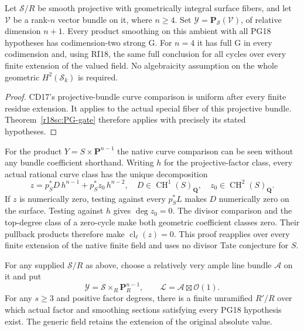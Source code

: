 \begin{corollary}
\label{r18sc:surface-bundle}
Let $\mathcal S/R$ be smooth projective with
geometrically integral surface fibers, and
let $\mathcal V$ be a rank-$n$ vector bundle
on it, where $n\ge4$.  Set
$\mathcal Y=\mathbf P_{\mathcal S}(\mathcal V)$,
of relative dimension $n+1$.
Every product smoothing on this ambient
with all PG18 hypotheses has codimension-two
strong G.  For $n=4$ it has full G in
every codimension and, using RI18, the
same full conclusion for all cycles over
every finite extension of the valued field.
No algebraicity assumption on the whole
geometric $H^2(\mathcal S_k)$ is required.
\end{corollary}

\begin{proof}
CD17's projective-bundle curve comparison
is uniform after every finite residue
extension.  It applies to the actual
special fiber of this projective bundle.
Theorem~\ref{r18sc:PG-gate} therefore
applies with precisely its stated hypotheses.
\end{proof}

For the product $Y=S\times\mathbf P^{n-1}$
the native curve comparison can be seen
without any bundle coefficient shorthand.
Writing $h$ for the projective-factor class,
every actual rational curve class has the
unique decomposition
\[
 z=p_S^*D\,h^{n-1}+p_S^*z_0\,h^{n-2},
 \quad D\in\operatorname{CH}^1(S)_{\mathbf Q},
 \quad z_0\in\operatorname{CH}^2(S)_{\mathbf Q}.
 \tag{SC18.6}\label{r18sc:product-curves}
\]
If $z$ is numerically zero, testing against
every $p_S^*L$ makes $D$ numerically zero
on the surface.  Testing against $h$ gives
$\deg z_0=0$.  The divisor comparison and
the top-degree class of a zero-cycle make
both geometric coefficient classes zero.
Their pullback products therefore make
$\operatorname{cl}_\ell(z)=0$.
This proof reapplies over every finite
extension of the native finite field and
uses no divisor Tate conjecture for $S$.

\begin{lemma}
\label{r18sc:local-existence}
For any supplied $\mathcal S/R$ as above,
choose a relatively very ample line bundle
$\mathcal A$ on it and put
\[
 \mathcal Y=\mathcal S\times_R\mathbf P_R^{n-1},
       \qquad\mathcal L=\mathcal A\boxtimes\mathcal O(1).
 \tag{SC18.7}\label{r18sc:product-polarization}
\]
For any $s\ge3$ and positive factor degrees,
there is a finite unramified $R'/R$ over
which actual factor and smoothing sections
satisfying every PG18 hypothesis exist.
The generic field retains the extension
of the original absolute value.
\end{lemma}

